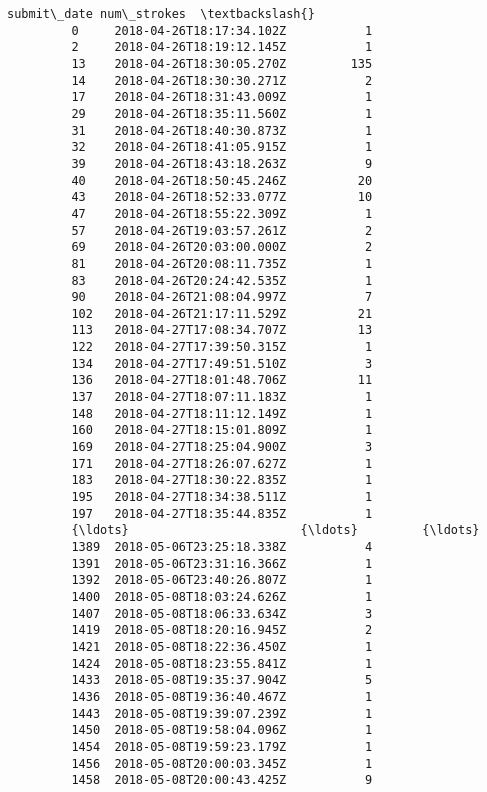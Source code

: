 \documentclass[11pt]{article}
\begin{document}
\begin{Verbatim}[commandchars=\\\{\}]
                            submit\_date num\_strokes  \textbackslash{}
         0     2018-04-26T18:17:34.102Z           1   
         2     2018-04-26T18:19:12.145Z           1   
         13    2018-04-26T18:30:05.270Z         135   
         14    2018-04-26T18:30:30.271Z           2   
         17    2018-04-26T18:31:43.009Z           1   
         29    2018-04-26T18:35:11.560Z           1   
         31    2018-04-26T18:40:30.873Z           1   
         32    2018-04-26T18:41:05.915Z           1   
         39    2018-04-26T18:43:18.263Z           9   
         40    2018-04-26T18:50:45.246Z          20   
         43    2018-04-26T18:52:33.077Z          10   
         47    2018-04-26T18:55:22.309Z           1   
         57    2018-04-26T19:03:57.261Z           2   
         69    2018-04-26T20:03:00.000Z           2   
         81    2018-04-26T20:08:11.735Z           1   
         83    2018-04-26T20:24:42.535Z           1   
         90    2018-04-26T21:08:04.997Z           7   
         102   2018-04-26T21:17:11.529Z          21   
         113   2018-04-27T17:08:34.707Z          13   
         122   2018-04-27T17:39:50.315Z           1   
         134   2018-04-27T17:49:51.510Z           3   
         136   2018-04-27T18:01:48.706Z          11   
         137   2018-04-27T18:07:11.183Z           1   
         148   2018-04-27T18:11:12.149Z           1   
         160   2018-04-27T18:15:01.809Z           1   
         169   2018-04-27T18:25:04.900Z           3   
         171   2018-04-27T18:26:07.627Z           1   
         183   2018-04-27T18:30:22.835Z           1   
         195   2018-04-27T18:34:38.511Z           1   
         197   2018-04-27T18:35:44.835Z           1   
         {\ldots}                        {\ldots}         {\ldots}   
         1389  2018-05-06T23:25:18.338Z           4   
         1391  2018-05-06T23:31:16.366Z           1   
         1392  2018-05-06T23:40:26.807Z           1   
         1400  2018-05-08T18:03:24.626Z           1   
         1407  2018-05-08T18:06:33.634Z           3   
         1419  2018-05-08T18:20:16.945Z           2   
         1421  2018-05-08T18:22:36.450Z           1   
         1424  2018-05-08T18:23:55.841Z           1   
         1433  2018-05-08T19:35:37.904Z           5   
         1436  2018-05-08T19:36:40.467Z           1   
         1443  2018-05-08T19:39:07.239Z           1   
         1450  2018-05-08T19:58:04.096Z           1   
         1454  2018-05-08T19:59:23.179Z           1   
         1456  2018-05-08T20:00:03.345Z           1   
         1458  2018-05-08T20:00:43.425Z           9   

\end{Verbatim}
\end{document}
